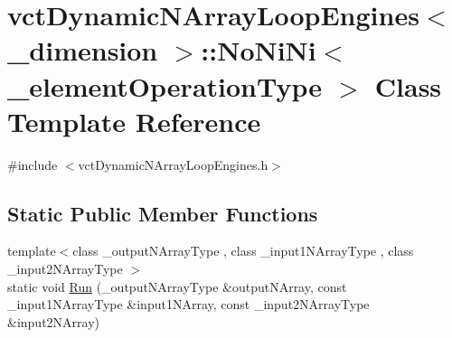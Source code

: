 \hypertarget{classvct_dynamic_n_array_loop_engines_1_1_no_ni_ni}{\section{vct\-Dynamic\-N\-Array\-Loop\-Engines$<$ \-\_\-dimension $>$\-:\-:No\-Ni\-Ni$<$ \-\_\-element\-Operation\-Type $>$ Class Template Reference}
\label{classvct_dynamic_n_array_loop_engines_1_1_no_ni_ni}
}


{\ttfamily \#include $<$vct\-Dynamic\-N\-Array\-Loop\-Engines.\-h$>$}

\subsection*{Static Public Member Functions}
\begin{DoxyCompactItemize}
\item 
{\footnotesize template$<$class \-\_\-output\-N\-Array\-Type , class \-\_\-input1\-N\-Array\-Type , class \-\_\-input2\-N\-Array\-Type $>$ }\\static void \hyperlink{classvct_dynamic_n_array_loop_engines_1_1_no_ni_ni_a0b894eae797fdba3acdeb81c04ce3736}{Run} (\-\_\-output\-N\-Array\-Type \&output\-N\-Array, const \-\_\-input1\-N\-Array\-Type \&input1\-N\-Array, const \-\_\-input2\-N\-Array\-Type \&input2\-N\-Array)
\end{DoxyCompactItemize}


